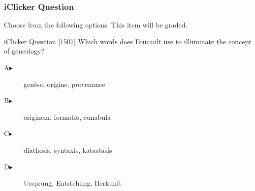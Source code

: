 \begin{frame}
  \frametitle{iClicker Question}
Choose from the following options. This item will be graded.
\begin{block}{iClicker Question}
[1507] Which words does Foucault use to illuminate the concept of genealogy?
\end{block}
\begin{description}
\item[A\hspace{.2in}$\blacktriangleright$] gen{\`e}se, origine, provenance
\item[B\hspace{.2in}$\blacktriangleright$] originem, formatio, cunabula
\item[C\hspace{.2in}$\blacktriangleright$] diathesis, syntaxis, katastasis
\item[D\hspace{.2in}$\blacktriangleright$] Ursprung, Entstehung, Herkunft
\end{description}
\end{frame}